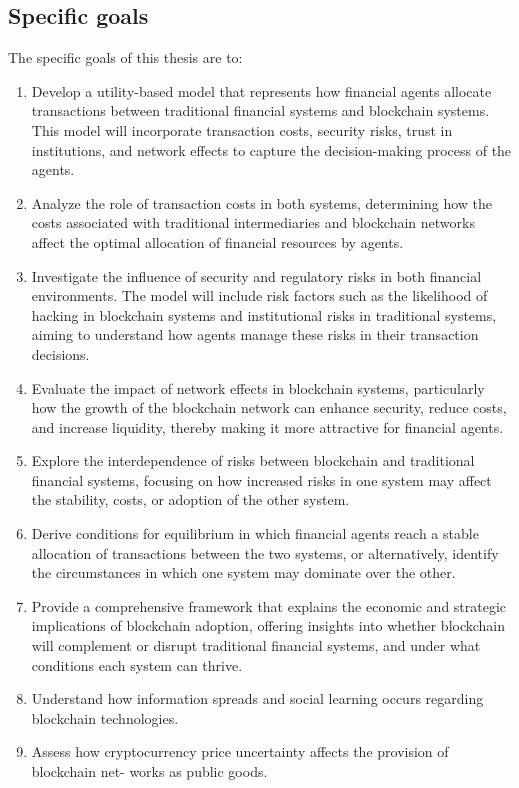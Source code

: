 \subsection{Specific goals}

The specific goals of this thesis are to:

\begin{enumerate}
\item Develop a utility-based model that represents how financial agents allocate transactions between traditional financial systems and blockchain systems. This model will incorporate transaction costs, security risks, trust in institutions, and network effects to capture the decision-making process of the agents.

\item Analyze the role of transaction costs in both systems, determining how the costs associated with traditional intermediaries and blockchain networks affect the optimal allocation of financial resources by agents.

\item Investigate the influence of security and regulatory risks in both financial environments. The model will include risk factors such as the likelihood of hacking in blockchain systems and institutional risks in traditional systems, aiming to understand how agents manage these risks in their transaction decisions.

\item Evaluate the impact of network effects in blockchain systems, particularly how the growth of the blockchain network can enhance security, reduce costs, and increase liquidity, thereby making it more attractive for financial agents. 

\item Explore the interdependence of risks between blockchain and traditional financial systems, focusing on how increased risks in one system may affect the stability, costs, or adoption of the other system.

\item Derive conditions for equilibrium in which financial agents reach a stable allocation of transactions between the two systems, or alternatively, identify the circumstances in which one system may dominate over the other.

\item Provide a comprehensive framework that explains the economic and strategic implications of blockchain adoption, offering insights into whether blockchain will complement or disrupt traditional financial systems, and under what conditions each system can thrive.

\item Understand how information spreads and social learning occurs regarding blockchain
technologies.

\item Assess how cryptocurrency price uncertainty affects the provision of blockchain net-
works as public goods.
\end{enumerate}


